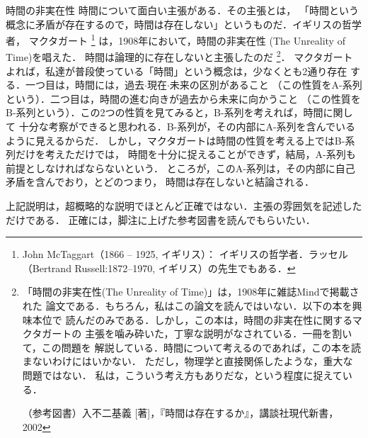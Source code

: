             \begin{memo}{時間の非実在性}
                時間について面白い主張がある．その主張とは，
                「時間という概念に矛盾が存在するので，時間は存在しない」というものだ．イギリスの哲学者，
                マクタガート
                    \footnote{
                        John McTaggart（1866 -- 1925, イギリス）：
                        イギリスの哲学者．ラッセル（Bertrand Russell:1872--1970, イギリス）の先生でもある．
                    }
                は，1908年において，時間の非実在性 (The Unreality of Time)を唱えた．
                時間は論理的に存在しないと主張したのだ
                    \footnote{
                        「時間の非実在性(The Unreality of Time)」は，1908年に雑誌Mindで掲載された
                        論文である．もちろん，私はこの論文を読んではいない．以下の本を興味本位で
                        読んだのみである．しかし，この本は，時間の非実在性に関するマクタガートの
                        主張を噛み砕いた，丁寧な説明がなされている．一冊を割いて，この問題を
                        解説している．時間について考えるのであれば，この本を読まないわけにはいかない．
                        ただし，物理学と直接関係したような，重大な問題ではない．
                        私は，こういう考え方もありだな，という程度に捉えている．

                        （参考図書）入不二基義 [著]，『時間は存在するか』，講談社現代新書，2002
                    }．
                マクタガートよれば，私達が普段使っている「時間」という概念は，少なくとも2通り存在
                する．一つ目は，時間には，過去$\cdot$現在$\cdot$未来の区別があること
                （この性質をA-系列という）．二つ目は，時間の進む向きが過去から未来に向かうこと
                （この性質をB-系列という）．この2つの性質を見てみると，B-系列を考えれば，時間に関して
                十分な考察ができると思われる．B-系列が，その内部にA-系列を含んでいるように見えるからだ．
                しかし，マクタガートは時間の性質を考える上ではB-系列だけを考えただけでは，
                時間を十分に捉えることができず，結局，A-系列も前提としなければならないという．
                ところが，このA-系列は，その内部に自己矛盾を含んでおり，とどのつまり，
                時間は存在しないと結論される．

                上記説明は，超概略的な説明でほとんど正確ではない．主張の雰囲気を記述しただけである．
                正確には，脚注に上げた参考図書を読んでもらいたい．
            \end{memo}

